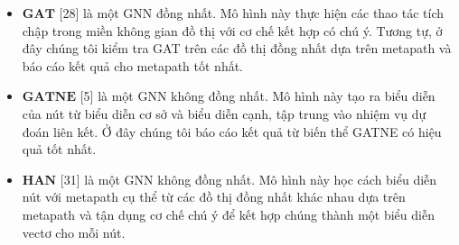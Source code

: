 \begin{itemize}
  \item $\mathbf{GAT}$ [28] là một GNN đồng nhất. Mô hình này thực hiện các thao tác tích chập trong miền không gian đồ thị với cơ chế kết hợp có chú ý. Tương tự, ở đây chúng tôi kiểm tra GAT trên các đồ thị đồng nhất dựa trên metapath và báo cáo kết quả cho metapath tốt nhất.
  \item $\mathbf{GATNE}$ [5] là một GNN không đồng nhất. Mô hình này tạo ra biểu diễn của nút từ biểu diễn cơ sở và biểu diễn cạnh, tập trung vào nhiệm vụ dự đoán liên kết. Ở đây chúng tôi báo cáo kết quả từ biến thể GATNE có hiệu quả tốt nhất.
  \item $\mathbf{HAN}$ [31] là một GNN không đồng nhất. Mô hình này học cách biểu diễn nút với metapath cụ thể từ các đồ thị đồng nhất khác nhau dựa trên metapath và tận dụng cơ chế chú ý để kết hợp chúng thành một biểu diễn vectơ cho mỗi nút.
\end{itemize}

